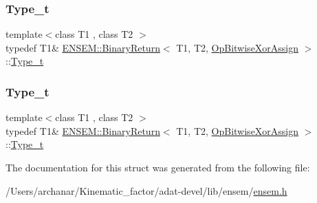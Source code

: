 \mbox{\label{structENSEM_1_1BinaryReturn_3_01T1_00_01T2_00_01OpBitwiseXorAssign_01_4_afa71b93b033427a13f9ffcbcb4ffb6dc}} 
\subsubsection{\texorpdfstring{Type\_t}{Type\_t}\hspace{0.1cm}{\footnotesize\ttfamily [2/3]}}
{\footnotesize\ttfamily template$<$class T1 , class T2 $>$ \\
typedef T1\& \mbox{\hyperlink{structENSEM_1_1BinaryReturn}{E\+N\+S\+E\+M\+::\+Binary\+Return}}$<$ T1, T2, \mbox{\hyperlink{structENSEM_1_1OpBitwiseXorAssign}{Op\+Bitwise\+Xor\+Assign}} $>$\+::\mbox{\hyperlink{structENSEM_1_1BinaryReturn_3_01T1_00_01T2_00_01OpBitwiseXorAssign_01_4_afa71b93b033427a13f9ffcbcb4ffb6dc}{Type\+\_\+t}}}

\mbox{\label{structENSEM_1_1BinaryReturn_3_01T1_00_01T2_00_01OpBitwiseXorAssign_01_4_afa71b93b033427a13f9ffcbcb4ffb6dc}} 
\subsubsection{\texorpdfstring{Type\_t}{Type\_t}\hspace{0.1cm}{\footnotesize\ttfamily [3/3]}}
{\footnotesize\ttfamily template$<$class T1 , class T2 $>$ \\
typedef T1\& \mbox{\hyperlink{structENSEM_1_1BinaryReturn}{E\+N\+S\+E\+M\+::\+Binary\+Return}}$<$ T1, T2, \mbox{\hyperlink{structENSEM_1_1OpBitwiseXorAssign}{Op\+Bitwise\+Xor\+Assign}} $>$\+::\mbox{\hyperlink{structENSEM_1_1BinaryReturn_3_01T1_00_01T2_00_01OpBitwiseXorAssign_01_4_afa71b93b033427a13f9ffcbcb4ffb6dc}{Type\+\_\+t}}}



The documentation for this struct was generated from the following file\+:\begin{DoxyCompactItemize}
\item 
/\+Users/archanar/\+Kinematic\+\_\+factor/adat-\/devel/lib/ensem/\mbox{\hyperlink{adat-devel_2lib_2ensem_2ensem_8h}{ensem.\+h}}\end{DoxyCompactItemize}
